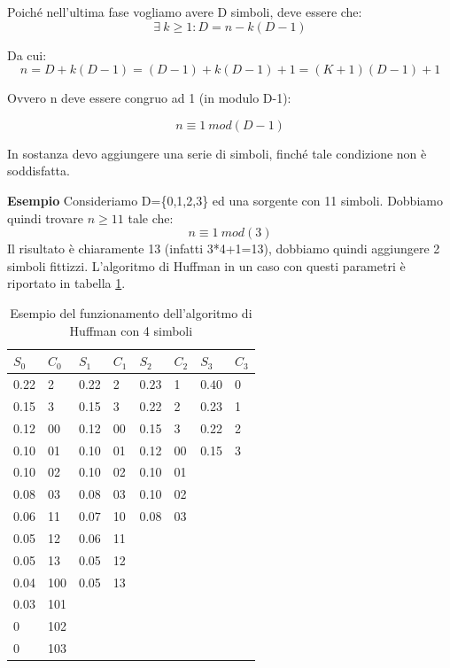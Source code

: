 Poiché nell'ultima fase vogliamo avere D simboli, deve essere che:
\[
 \exists \ k \ge 1 : D=n-k(D-1)
\]

Da cui:
\[
 n=D+k(D-1)=(D-1)+k(D-1)+1=(K+1)(D-1)+1
\]

Ovvero n deve essere congruo ad 1 (in modulo D-1):

\[
 n \equiv 1 \  mod(D-1)
\]

\noindent
In sostanza devo aggiungere una serie di simboli, finché tale condizione non è soddisfatta.

\bigskip
\noindent
\textbf{Esempio}
Consideriamo D=\{0,1,2,3\} ed una sorgente con 11 simboli.
Dobbiamo quindi trovare $n \ge 11$ tale che:
\[
 n \equiv 1 \  mod(3)
\]
Il risultato è chiaramente 13 (infatti 3*4+1=13), dobbiamo quindi aggiungere 2 simboli fittizzi.
L'algoritmo di Huffman in un caso con questi parametri è riportato in tabella \ref{tab:huffmanD}.

\begin{table}[htbp]
  \begin{center}
   \begin{tabular}{l|l|| l|l|| l|l|| l|l}
	 $S_0$ & $C_0$  & $S_1$ & $C_1$  & $S_2$ & $C_2$  & $S_3$ & $C_3$ \\
       \hline
	0.22 & 2   & 0.22 & 2       & $\boxed{0.23}$& 1 & $\boxed{0.40}$ & 0  \\ 
	0.15 & 3   & 0.15 & 3       & 0.22          & 2  & 0.23 & 1 \\ 
	0.12 & 00  & 0.12 & 00      & 0.15          & 3  & 0.22 & 2 \\ 
        0.10 & 01  & 0.10 & 01      & 0.12          & 00 & 0.15 & 3 \\ 
        0.10 & 02  & 0.10 & 02      & 0.10          & 01 & &\\ 
        0.08 & 03  & 0.08 & 03      & 0.10          & 02 & &\\
        0.06 & 11  & $\boxed{0.07}$ & 10 & 0.08     & 03 & &\\  
        0.05 & 12  & 0.06 & 11 & & &\\
        0.05 & 13  & 0.05 & 12 & & &\\
        0.04 & 100 & 0.05 & 13 & & &\\    
        0.03 & 101 & & & & &\\    
        \hline
        0 & 102 & & & & &\\    
        0 & 103 & & & & &\\    
    \end{tabular}
     
     \caption{Esempio del funzionamento dell'algoritmo di Huffman con 4 simboli}
    \label{tab:huffmanD}
  \end{center}
\end{table}


